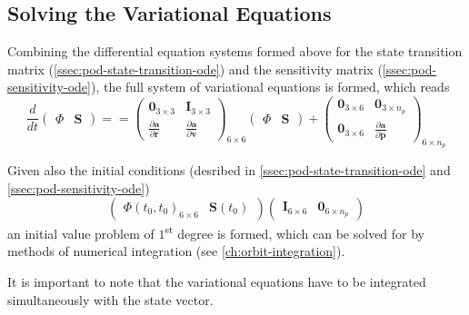 \subsection{Solving the Variational Equations}\label{ssec:pod-varequations-solution}
Combining the differential equation systems formed above for the state transition matrix 
(\autoref{ssec:pod-state-transition-ode}) and the sensitivity matrix (\autoref{ssec:pod-sensitivity-ode}),
the full system of variational equations is formed, which reads
\begin{equation}\label{eq:mont745}
    \frac{d}{dt} \begin{pmatrix} \Phi & \bm{S} \end{pmatrix} = 
    = \begin{pmatrix}
        \bm{0}_{3 \times 3} & \bm{I}_{3 \times 3} \\
        \frac{\partial \bm{a}}{\partial \bm{r}} &
        \frac{\partial \bm{a}}{\partial \bm{v}}
    \end{pmatrix}_{6 \times 6} \begin{pmatrix} \Phi & \bm{S} \end{pmatrix}
    + 
    \begin{pmatrix}
        \bm{0}_{3 \times 6} & \bm{0}_{3 \times n_p} \\
        \bm{0}_{3 \times 6} & \frac{\partial \bm{a}}{\partial \bm{p}}
    \end{pmatrix}_{6 \times n_p}
\end{equation}

Given also the initial conditions (desribed in \autoref{ssec:pod-state-transition-ode} and 
\autoref{ssec:pod-sensitivity-ode})
\begin{equation}
    \begin{pmatrix}\Phi (t_0,t_0) _{6 \times 6} & \bm{S}(t_0) _{}\end{pmatrix}
    \begin{pmatrix} \bm{I}_{6 \times 6} & \bm{0}_{6 \times n_p} \end{pmatrix}
\end{equation}
an initial value problem of $1$\textsuperscript{st} degree is formed, which can 
be solved for by methods of numerical integration (see \autoref{ch:orbit-integration}).

It is important to note that the variational equations have to be integrated 
simultaneously with the state vector.